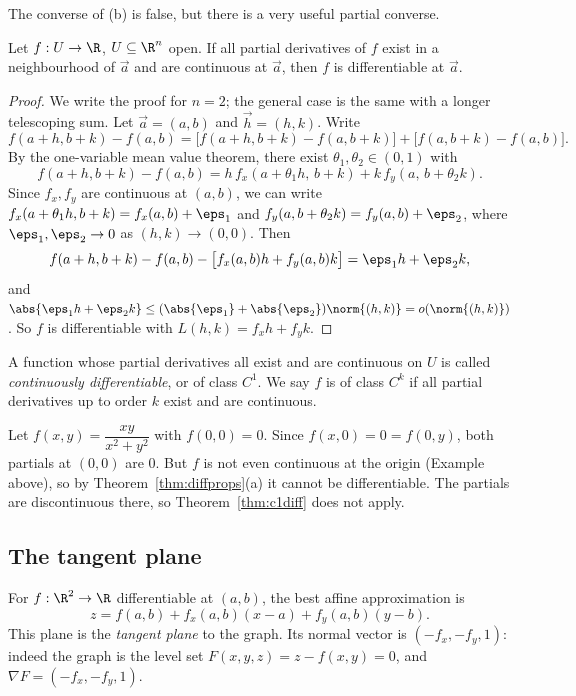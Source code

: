 The converse of (b) is false, but there is a very useful partial converse.

\begin{theorem}\label{thm:c1diff}
Let $f:U\to\R$, $U\subseteq\R^n$ open. If all partial derivatives of $f$ exist in a neighbourhood of $\vec a$ and are continuous at $\vec a$, then $f$ is differentiable at $\vec a$.
\end{theorem}

\begin{proof}
We write the proof for $n=2$; the general case is the same with a longer telescoping sum. Let $\vec a=(a,b)$ and $\vec h=(h,k)$. Write
\[
f(a+h,b+k)-f(a,b)=\bigl[f(a+h,b+k)-f(a,b+k)\bigr]+\bigl[f(a,b+k)-f(a,b)\bigr].
\]
By the one-variable mean value theorem, there exist $\theta_1,\theta_2\in(0,1)$ with
\[
f(a+h,b+k)-f(a,b)=h\,f_x(a+\theta_1h,\,b+k)+k\,f_y(a,\,b+\theta_2k).
\]
Since $f_x,f_y$ are continuous at $(a,b)$, we can write $f_x(a+\theta_1h,b+k)=f_x(a,b)+\eps_1$ and $f_y(a,b+\theta_2k)=f_y(a,b)+\eps_2$, where $\eps_1,\eps_2\to0$ as $(h,k)\to(0,0)$. Then
\[
f(a+h,b+k)-f(a,b)-\bigl[f_x(a,b)h+f_y(a,b)k\bigr]=\eps_1h+\eps_2k,
\]
and $\abs{\eps_1h+\eps_2k}\le(\abs{\eps_1}+\abs{\eps_2})\norm{(h,k)}=o(\norm{(h,k)})$. So $f$ is differentiable with $L(h,k)=f_xh+f_yk$.
\end{proof}

A function whose partial derivatives all exist and are continuous on $U$ is called \emph{continuously differentiable}, or of class $C^1$. We say $f$ is of class $C^k$ if all partial derivatives up to order $k$ exist and are continuous.

\begin{example}
Let $f(x,y)=\dfrac{xy}{x^2+y^2}$ with $f(0,0)=0$. Since $f(x,0)=0=f(0,y)$, both partials at $(0,0)$ are $0$. But $f$ is not even continuous at the origin (Example above), so by Theorem~\ref{thm:diffprops}(a) it cannot be differentiable. The partials are discontinuous there, so Theorem~\ref{thm:c1diff} does not apply.
\end{example}

\subsection{The tangent plane}

For $f:\R^2\to\R$ differentiable at $(a,b)$, the best affine approximation is
\[
z=f(a,b)+f_x(a,b)(x-a)+f_y(a,b)(y-b).
\]
This plane is the \emph{tangent plane} to the graph. Its normal vector is $(-f_x,-f_y,1)$: indeed the graph is the level set $F(x,y,z)=z-f(x,y)=0$, and $\nabla F=(-f_x,-f_y,1)$.


